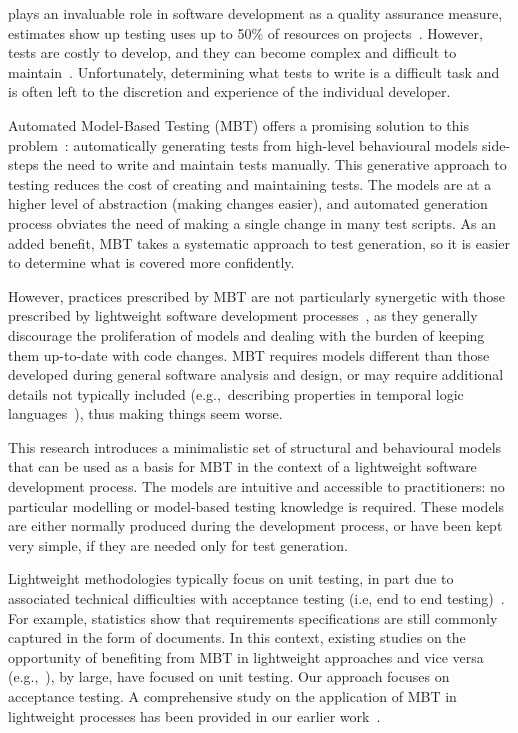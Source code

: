 %
%
\label{sec:introduction}
 plays an invaluable role in software development as a quality assurance measure, estimates show up testing uses up to 50\% of resources on projects~\cite{Beizer1990}. However, tests are costly to develop, and they can become complex and difficult to maintain~\cite{Farago2010a}. Unfortunately, determining what tests to write is a difficult task and is often left to the discretion and experience of the individual developer.

Automated Model-Based Testing (MBT) offers a promising solution to this problem~\cite{Tretmans2008}: automatically generating tests from high-level behavioural models side-steps the need to write and maintain tests manually. 
This generative approach to testing reduces the cost of creating and maintaining tests. The models are at a higher level of abstraction (making changes easier), and automated generation process obviates the need of making a single change in many test scripts. 
As an added benefit, MBT takes a systematic approach to test generation, so it is easier to determine what is covered more confidently.

However, practices prescribed by MBT are not particularly synergetic with those prescribed by lightweight software development processes~\cite{Farago2010a}, as they generally discourage the proliferation of models and dealing with the burden of keeping them up-to-date with code changes. 
MBT requires models different than those developed during general software analysis and design, or may require additional details not typically included (e.g.,\ describing properties in temporal logic languages~\cite{Tan2004}), thus making things seem worse. %

This research introduces a minimalistic set of structural and behavioural models that can be used as a basis for MBT in the context of a lightweight software development process. The models are intuitive and accessible to practitioners: no particular modelling or model-based testing knowledge is required. These models are either normally produced during the development process, or have been kept very simple, if they are needed only for test generation.

Lightweight methodologies typically focus on unit testing, in part due to associated technical difficulties with acceptance testing (i.e, end to end testing)~\cite{Ambler2008,Ambler}. For example, statistics show that requirements specifications are still commonly captured in the form of documents. 
In this context, existing studies on the opportunity of benefiting from MBT in lightweight approaches and vice versa (e.g.,~\cite{Katara2006,Farago2010b,Loffler2010,Ussami2016}), by large, have focused on unit testing. Our approach focuses on acceptance testing.
A comprehensive study on the application of MBT in lightweight processes has been provided in our earlier work~\cite{Jalalinasab2012}. 

